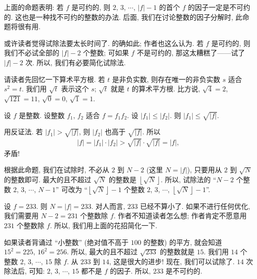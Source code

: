 \begin{remark}
    上面的命题表明: 若 $f$ 是可约的, 则 $2$, $3$, $\cdots$, $|f|-1$ 的首个 $f$ 的因子一定是不可约的. 这也是一种找不可约的整数的办法. 后面, 我们在讨论整数的因子分解时, 此命题将很有用.
\end{remark}

或许读者觉得试除法要太长时间了. 的确如此; 作者也这么认为. 若 $f$ 是可约的, 则我们不必试全部的 $|f| - 2$ 个整数; 可如果 $f$ 不是可约的, 那这太糟糕了——试了 $|f| - 2$ 次. 所以, 我们有必要简化试除法.

请读者先回忆一下算术平方根. 若 $t$ 是非负实数, 则存在唯一的非负实数 $s$ 适合 $s^2 = t$. 我们用 $\sqrt{t}$ 表示这个 $s$; $\sqrt{t}$ 就是 $t$ 的算术平方根. 比方说, $\sqrt{4} = 2$, $\sqrt{121} = 11$, $\sqrt{0} = 0$, $\sqrt{1} = 1$.

\begin{proposition}
    设 $f$ 是整数. 设整数 $f_1$, $f_2$ 适合 $f = f_1 f_2$. 设 $|f_1| \leq |f_2|$. 则 $|f_1| \leq \sqrt{|f|}$.
\end{proposition}

\begin{pf}
    用反证法. 若 $|f_1| > \sqrt{|f|}$, 则 $|f_2|$ 也高于 $\sqrt{|f|}$. 所以
    \begin{align*}
        |f| = |f_1| \cdot |f_2| > \sqrt{|f|} \cdot \sqrt{|f|} = |f|,
    \end{align*}
    矛盾!
\end{pf}

根据此命题, 我们在试除时, 不必从 $2$ 到 $N-2$ (这里 $N = |f|$), 只要用从 $2$ 到 $\sqrt{N}$ 的整数即可. 最大的且不超过 $\sqrt{N}$ 的整数是 $\left \lfloor \sqrt{N} \right \rfloor$. 所以, 试除法的 ``$N-2$ 个整数 $2$, $3$, $\cdots$, $N-1$'' 可改为 ``$\left \lfloor \sqrt{N} \right \rfloor - 1$ 个整数 $2$, $3$, $\cdots$, $\left \lfloor \sqrt{N} \right \rfloor - 1$''.

\begin{example}
    设 $f = 233$. 则 $N = |f| = 233$. 对人而言, $233$ 已经不算小了. 如果不进行任何优化, 我们需要用 $N-2 = 231$ 个整数除 $f$. 作者不知道读者怎么想; 作者肯定不愿意用 $231$ 个整数除 $f$. 所以, 我们用上面的花招简化一下.

    如果读者背诵过 ``小整数'' (绝对值不高于 $100$ 的整数) 的平方, 就会知道 $15^2 = 225$, $16^2 = 256$. 所以, 最大的且不超过 $\sqrt{233}$ 的整数就是 $15$. 我们用 $14$ 个整数 $2$, $3$, $\cdots$, $15$ 除 $f$. 从 $233$ 到 $14$, 这是很大的进步! 现在, 我们可以试除了. $14$ 次除法后, 可知: $2$, $3$, $\cdots$, $15$ 都不是 $f$ 的因子. 所以, $233$ 是不可约的.
\end{example}

